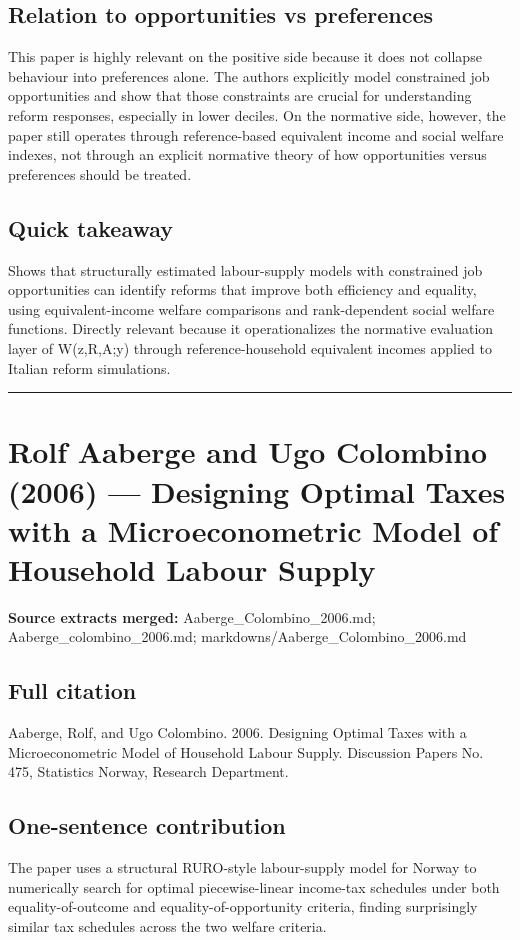 \documentclass[11pt,a4paper]{article}
\begin{document}
\subsection*{Relation to opportunities vs preferences}
This paper is highly relevant on the positive side because it does not collapse behaviour into preferences alone. The authors explicitly model constrained job opportunities and show that those constraints are crucial for understanding reform responses, especially in lower deciles. On the normative side, however, the paper still operates through reference-based equivalent income and social welfare indexes, not through an explicit normative theory of how opportunities versus preferences should be treated.

\subsection*{Quick takeaway}
Shows that structurally estimated labour-supply models with constrained job opportunities can identify reforms that improve both efficiency and equality, using equivalent-income welfare comparisons and rank-dependent social welfare functions. Directly relevant because it operationalizes the normative evaluation layer of W(z,R,A;y) through reference-household equivalent incomes applied to Italian reform simulations.


\medskip\hrule\medskip

\section*{Rolf Aaberge and Ugo Colombino (2006) — Designing Optimal Taxes with a Microeconometric Model of Household Labour Supply}

\textbf{Source extracts merged:} Aaberge\_Colombino\_2006.md; Aaberge\_colombino\_2006.md; markdowns/Aaberge\_Colombino\_2006.md

\subsection*{Full citation}
Aaberge, Rolf, and Ugo Colombino. 2006. Designing Optimal Taxes with a Microeconometric Model of Household Labour Supply. Discussion Papers No. 475, Statistics Norway, Research Department.

\subsection*{One-sentence contribution}
The paper uses a structural RURO-style labour-supply model for Norway to numerically search for optimal piecewise-linear income-tax schedules under both equality-of-outcome and equality-of-opportunity criteria, finding surprisingly similar tax schedules across the two welfare criteria.
\end{document}
